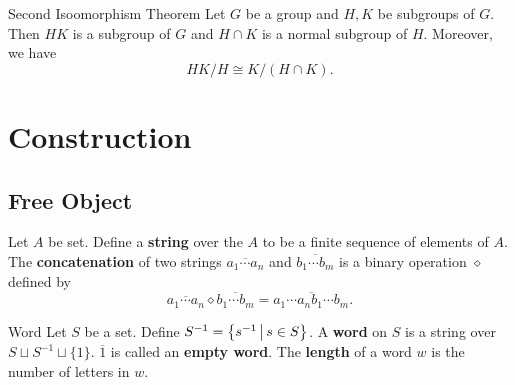 \begin{theorem}{Second Isoomorphism Theorem}{}
    Let $G$ be a group and $H,K$ be subgroups of $G$. Then $HK$ is a subgroup of $G$ and $H\cap K$ is a normal subgroup of $H$. Moreover, we have
    \[
        HK/H\cong K/(H\cap K).
    \]
\end{theorem}

\section{Construction}
\subsection{Free Object}
Let $A$ be set. Define a \textbf{string} over the $A$ to be a finite sequence of elements of $A$. The \textbf{concatenation} of two strings $\overline{a_1\cdots a_n}$ and $\overline{b_1\cdots b_m}$ is a binary operation $\diamond$ defined by
\[
    \overline{a_1\cdots a_n}\diamond \overline{b_1\cdots b_m}=\overline{a_1\cdots a_nb_1\cdots b_m}.
\]
\begin{definition}{Word}{}
    Let $S$ be a set. Define $S^{-1}=\left\{s^{-1}\,\middle\vert\, s\in S\right\}$. A \textbf{word} on $S$ is a string over $S\sqcup S^{-1}\sqcup\{1\}$. $\overline{1}$ is called an \textbf{empty word}. The \textbf{length} of a word $w$ is the number of letters in $w$.
\end{definition}

